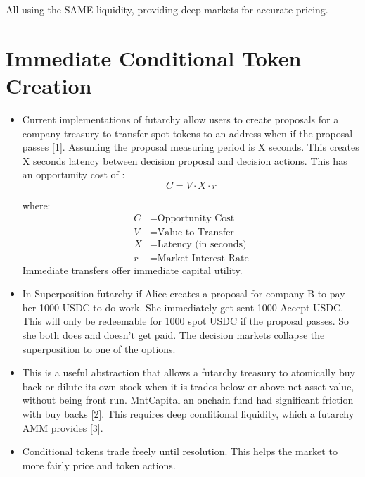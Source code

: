 \documentclass{article}
\begin{document}
All using the SAME liquidity, providing deep markets for accurate pricing.
    

\section{Immediate Conditional Token Creation}
\begin{itemize}
    \item Current implementations of futarchy allow users to create proposals for a company treasury to transfer spot tokens to an address when if the proposal passes [1]. Assuming the proposal measuring period is X seconds. This creates X seconds latency between decision proposal and decision actions. This has an opportunity cost of : \begin{equation}
    C = V \cdot X \cdot r
    \end{equation}
    
    where:
    \begin{align*}
    C &= \text{Opportunity Cost} \\
    V &= \text{Value to Transfer} \\
    X &= \text{Latency (in seconds)} \\
    r &= \text{Market Interest Rate}
    \end{align*}
    Immediate transfers offer immediate capital utility.
    \item In Superposition futarchy if Alice creates a proposal for company B to pay her 1000 USDC to do work. She immediately get sent 1000 Accept-USDC. This will only be redeemable for 1000 spot USDC if the proposal passes. So she both does and doesn't get paid. The decision markets collapse the superposition to one of the options.
    \item This is a useful abstraction that allows a futarchy treasury to atomically buy back or dilute its own stock when it is trades below or above net asset value, without being front run. MntCapital an onchain fund had significant friction with buy backs [2]. This requires deep conditional liquidity, which a futarchy AMM provides [3].
   \item Conditional tokens trade freely until resolution. This helps the market to more fairly price and token actions. 

\end{itemize}
\end{document}
